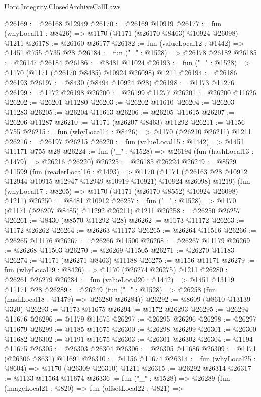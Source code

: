 \begin{lexlean}{Uorc.Integrity.ClosedArchiveCallLaws}
\begin{coremodule}
@26169 := @26168 @12949
@26170 := @26169 @10919
@26177 := fun (whyLocal11 : @8426) => @1170 (@1171 (@26170 @8463) @10924 @26098) @1211
@26178 := @26160 @26177
@26182 := fun (valueLocal12 : @1442) => @1451 @755 @735 @28
@26184 := fun ("_" : @1528) => @26178 @26182
@26185 := @26147 @26184
@26186 := @8481 @11024
@26193 := fun ("_" : @1528) => @1170 (@1171 (@26170 @8485) @10924 @26098) @1211
@26194 := @26186 @26193
@26197 := @8430 (@8494 @10924 @28)
@26198 := @1173 @11276
@26199 := @1172 @26198
@26200 := @26199 @11277
@26201 := @26200 @11626
@26202 := @26201 @11280
@26203 := @26202 @11610
@26204 := @26203 @11283
@26205 := @26204 @11613
@26206 := @26205 @11615
@26207 := @26206 @11287
@26210 := @1171 (@26207 @8463) @11292
@26211 := @1156 @755
@26215 := fun (whyLocal14 : @8426) => @1170 (@26210 @26211) @1211
@26216 := @26197 @26215
@26220 := fun (valueLocal15 : @1442) => @1451 @11171 @755 @28
@26224 := fun ("_" : @1528) => @26194 (fun (hashLocal13 : @1479) => @26216 @26220)
@26225 := @26185 @26224
@26249 := @8529
    @11599
    (fun (readerLocal16 : @1493) =>
    @1170 (@1171 (@26163 @28 @10912 @12944 @10915 @12947 @12949 @10919 @10921) @10924 @26098) @1219)
    (fun (whyLocal17 : @8205) => @1170 (@1171 (@26170 @8552) @10924 @26098) @1211)
@26250 := @8481 @10912
@26257 := fun ("_" : @1528) => @1170 (@1171 (@26207 @8485) @11292 @26211) @1211
@26258 := @26250 @26257
@26261 := @8430 (@8570 @11292 @28)
@26262 := @1173 @11172
@26263 := @1172 @26262
@26264 := @26263 @11173
@26265 := @26264 @11516
@26266 := @26265 @11176
@26267 := @26266 @11500
@26268 := @26267 @11179
@26269 := @26268 @11503
@26270 := @26269 @11505
@26271 := @26270 @11183
@26274 := @1171 (@26271 @8463) @11188
@26275 := @1156 @11171
@26279 := fun (whyLocal19 : @8426) => @1170 (@26274 @26275) @1211
@26280 := @26261 @26279
@26284 := fun (valueLocal20 : @1442) => @1451 @13119 @11171 @28
@26289 := @26249 (fun ("_" : @1528) => @26258 (fun (hashLocal18 : @1479) => @26280 @26284))
@26292 := @8609 (@8610 @13139 @320)
@26293 := @1173 @11675
@26294 := @1172 @26293
@26295 := @26294 @11676
@26296 := @1179 @11675
@26297 := @26295 @26296
@26298 := @26297 @11679
@26299 := @1185 @11675
@26300 := @26298 @26299
@26301 := @26300 @11682
@26302 := @1191 @11675
@26303 := @26301 @26302
@26304 := @1194 @11675
@26305 := @26303 @26304
@26306 := @26305 @11686
@26309 := @1171 (@26306 @8631) @11691
@26310 := @1156 @11674
@26314 := fun (whyLocal25 : @8604) => @1170 (@26309 @26310) @1211
@26315 := @26292 @26314
@26317 := @1133 @11564 @11674
@26336 := fun ("_" : @1528) =>
  @26289
    (fun (imageLocal21 : @820) =>
    fun (offsetLocal22 : @821) =>

\end{coremodule}
\end{lexlean}
